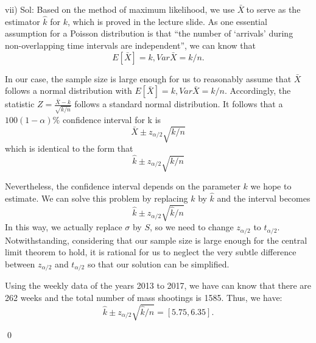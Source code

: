 \documentclass[english]{article}
\begin{document}
\noindent vii) Sol: Based on the method of maximum likelihood, we use $\bar X \ $to serve as the estimator $\hat {k}$ for $k$, which is proved in the lecture slide. As one essential assumption for a Poisson distribution is that ``the number of `arrivals' during non-overlapping time intervals are independent'', we can know that
\begin{equation*}
E[\bar X]=k, Var \bar X=k/n.
\end{equation*} 
\par In our case, the sample size is large enough for us to reasonably assume that $\bar X$ follows a normal distribution with $E[\bar X]=k, Var \bar X=k/n$. Accordingly, the statistic $Z=\frac{\bar X-k}{\sqrt{k/n}}$ follows a standard normal distribution. It follows that a $100(1-\alpha)\%$ confidence interval for k is
\begin{equation*}
\bar X \pm z_{\alpha/2} \sqrt{k/n}
\end{equation*}
which is identical to the form that
\begin{equation*}
\hat k \pm z_{\alpha/2} \sqrt{k/n}
\end{equation*}
\par Nevertheless, the confidence interval depends on the parameter $k$ we hope to estimate. We can solve this problem by replacing $k$ by $\hat k$ and the interval becomes
\begin{equation*}
\hat k \pm z_{\alpha/2} \sqrt{\hat k/n}
\end{equation*}
In this way, we actually replace $\sigma $ by $S$, so we need to change $z_{\alpha/2}$ to $t_{\alpha/2}$. Notwithstanding, considering that our sample size is large enough for the central limit theorem to hold, it is rational for us to neglect the very subtle difference between $z_{\alpha/2}$ and $t_{\alpha/2}$ so that our solution can be simplified.
\par Using the weekly data of the years 2013 to 2017, we have can know that there are 262 weeks and the total number of mass shootings is 1585. Thus, we have:
\begin{equation*}
\hat k \pm z_{\alpha/2} \sqrt{\hat k/n}=[ 5.75,6.35 ].
\end{equation*}
\par \qed
\end{document}
